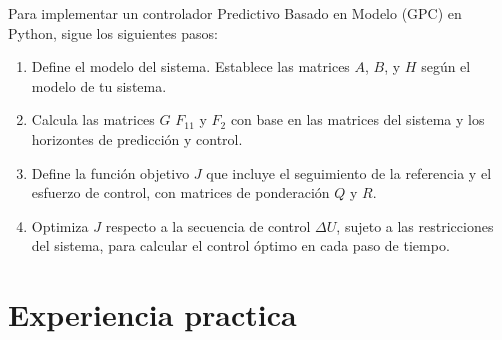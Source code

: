 \documentclass[journal]{IEEEtran}
\begin{document}
Para implementar un controlador Predictivo Basado en Modelo (GPC) en Python, sigue los siguientes pasos:

\begin{enumerate}
    \item Define el modelo del sistema. Establece las matrices \( A \), \( B \), y \( H \) según el modelo de tu sistema.
    \item Calcula las matrices \( G \) \( F_{11} \) y \( F_2 \) con base en las matrices del sistema y los horizontes de predicción y control.
    \item Define la función objetivo \( J \) que incluye el seguimiento de la referencia y el esfuerzo de control, con matrices de ponderación \( Q \) y \( R \).
    \item Optimiza \( J \) respecto a la secuencia de control \( \Delta U \), sujeto a las restricciones del sistema, para calcular el control óptimo en cada paso de tiempo.
\end{enumerate}


\section{Experiencia practica}

%
%

\end{document}
